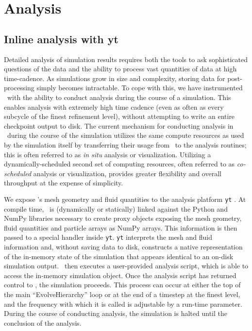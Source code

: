 
\section{Analysis}
\label{sec.num.analysis}

\subsection{Inline analysis with yt}

Detailed analysis of simulation results requires both the tools to ask
sophisticated questions of the data and the ability to process vast quantities of
data at high time-cadence.  As simulations grow in size and complexity, storing data
for post-processing simply becomes intractable.  To cope with this, we have
instrumented \enzo\ with the ability to conduct analysis during the course of a
simulation.  This enables analysis with extremely high time cadence (even as often
as every subcycle of the finest refinement level), without
attempting to write an entire checkpoint output to disk.  The current mechanism
for conducting analysis in \enzo\ during the course of the simulation utilizes
the same compute resources as used by the simulation itself by transferring their usage 
from \enzo\ to the analysis routines; this is often
referred to as \textit{in situ} analysis or visualization.  Utilizing a
dynamically-scheduled second set of computing resources, often referred to as
\textit{co-scheduled} analysis or visualization, provides greater flexibility and overall
throughput at the expense of simplicity.

We expose \enzo's mesh geometry and fluid quantities to the analysis platform
\texttt{yt} \citep{2011ApJS..192....9T, 2011arXiv1112.4482T}.  At compile time,
\enzo\ is (dynamically or statically) linked against the Python and NumPy
libraries necessary to create proxy objects exposing the mesh geometry,
fluid quantities and particle arrays as NumPy arrays.  This information is then
passed to a special handler inside \texttt{yt}.  \texttt{yt} interprets the
mesh and fluid information and, without saving data to disk, constructs a native representation of the in-memory state
of the simulation that appears identical to an on-disk simulation output.
\enzo\ then executes a user-provided analysis script, which is able to access the
in-memory simulation object.  Once the analysis script has returned control to
\enzo, the simulation proceeds.  This process can occur at either the top of the
main ``EvolveHierarchy'' loop or at the end of a timestep at the finest level,
and the frequency with which it is called is adjustable by a run-time
parameter.  During the course of conducting analysis, the simulation is halted
until the conclusion of the analysis.

